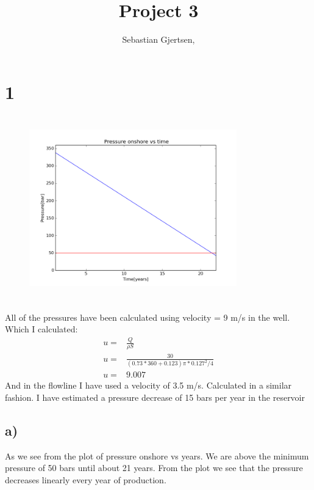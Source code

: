 \documentclass[DIV=calc, paper=a4, fontsize=13pt, twocolumn]{scrartcl}	 %
\title{Project 3} %
\author{Sebastian Gjertsen, } %
\date{} %
\begin{document}
\maketitle %

\thispagestyle{fancy} %







\section*{1}
\begin{figure}[h]
\includegraphics[width=9cm,height=8cm]{Pressure_years.png}
\end{figure}
All of the pressures have been calculated using velocity = 9 m/s in the well. Which I calculated:
\begin{align*}
u =& \frac{Q}{\rho S}  \\  
u =& \frac{30}{(0.73*360+0.123)\pi*0.127^2/4}\\
u =& 9.007
\end{align*}
And in the flowline I have used a velocity of 3.5 m/s. Calculated in a similar fashion.
I have estimated a pressure decrease of 15 bars per year in the reservoir
\subsection*{a)}
As we see from the plot of pressure onshore vs years. We are above the minimum pressure of 50 bars until about 21 years. From the plot we see that the pressure decreases linearly every year of production.
\end{document}
